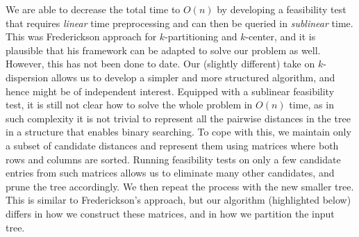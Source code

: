 \documentclass[a4paper,UKenglish]{lipics-v2016}
\theoremstyle{plain}
\begin{document}
 
\medskip {}
We are able to decrease the total time to $O(n)$ by
developing a feasibility test that requires {\em linear} time preprocessing and can then be queried in \emph{sublinear} time. This was Frederickson approach for $k$-partitioning and $k$-center, and it is plausible that his framework can be adapted to solve our problem as well.
However, this has not been done to date. Our (slightly different) take on $k$-dispersion allows us to develop a  simpler and more structured algorithm, and hence might be of independent interest.
Equipped with a sublinear feasibility test, it is still not clear how to solve the whole problem in $O(n)$ time, as in such complexity it is not trivial to represent all the pairwise distances in the tree in a structure that enables binary searching. To cope with this, we maintain only a subset of candidate distances and represent them using matrices where both rows and columns are sorted. Running feasibility tests on only a few candidate entries from such matrices allows us to eliminate many other candidates, and prune the tree accordingly. We then repeat the process with the new smaller tree.
This is similar to Frederickson's approach, but our algorithm (highlighted below) differs in how we construct these matrices, and in how we partition the input tree. 
\end{document}
